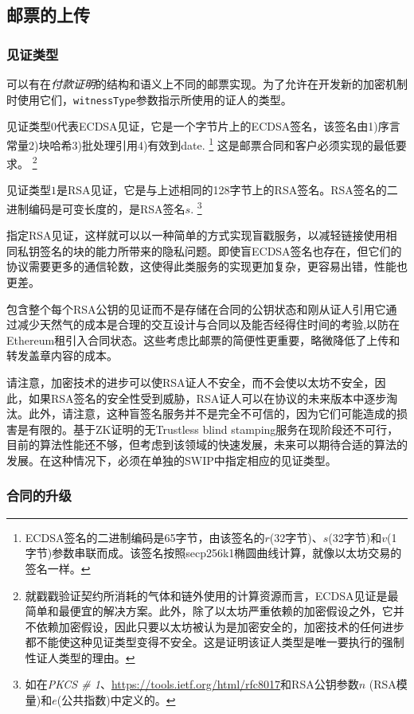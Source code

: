 
\subsection{邮票的上传}
\subsubsection{见证类型}

可以有在\emph{付款证明}的结构和语义上不同的邮票实现。为了允许在开发新的加密机制时使用它们，\lstinline{witnessType}参数指示所使用的证人的类型。 

见证类型$0$代表ECDSA见证，它是一个字节片上的ECDSA签名，该签名由1)序言常量2)块哈希3)批处理引用4)有效到date.%
%
\footnote{ECDSA签名的二进制编码是65字节，由该签名的$r$(32字节)、$s$(32字节)和$v$(1字节)参数串联而成。该签名按照secp256k1椭圆曲线计算，就像以太坊交易的签名一样。}
%
这是邮票合同和客户必须实现的最低要求。%
%
\footnote{就戳戳验证契约所消耗的气体和链外使用的计算资源而言，ECDSA见证是最简单和最便宜的解决方案。此外，除了以太坊严重依赖的加密假设之外，它并不依赖加密假设，因此只要以太坊被认为是加密安全的，加密技术的任何进步都不能使这种见证类型变得不安全。这是证明该证人类型是唯一要执行的强制性证人类型的理由。}

见证类型$1$是RSA见证，它是与上述相同的128字节上的RSA签名。RSA签名的二进制编码是可变长度的，是RSA签名$s$.%
%
\footnote{如在\emph{PKCS \# 1}、\url{https://tools.ietf.org/html/rfc8017}和RSA公钥参数$n$ (RSA模量)和$e$(公共指数)中定义的。}

指定RSA见证，这样就可以以一种简单的方式实现盲戳服务，以减轻链接使用相同私钥签名的块的能力所带来的隐私问题。即使盲ECDSA签名也存在，但它们的协议需要更多的通信轮数，这使得此类服务的实现更加复杂，更容易出错，性能也更差。 

包含整个每个RSA公钥的见证而不是存储在合同的公钥状态和刚从证人引用它通过减少天然气的成本是合理的交互设计与合同以及能否经得住时间的考验,以防在Ethereum租引入合同状态。这些考虑比邮票的简便性更重要，略微降低了上传和转发盖章内容的成本。

请注意，加密技术的进步可以使RSA证人不安全，而不会使以太坊不安全，因此，如果RSA签名的安全性受到威胁，RSA证人可以在协议的未来版本中逐步淘汰。此外，请注意，这种盲签名服务并不是完全不可信的，因为它们可能造成的损害是有限的。基于ZK证明的无Trustless blind stamping服务在现阶段还不可行，目前的算法性能还不够，但考虑到该领域的快速发展，未来可以期待合适的算法的发展。在这种情况下，必须在单独的SWIP中指定相应的见证类型。

\subsubsection{合同的升级}

